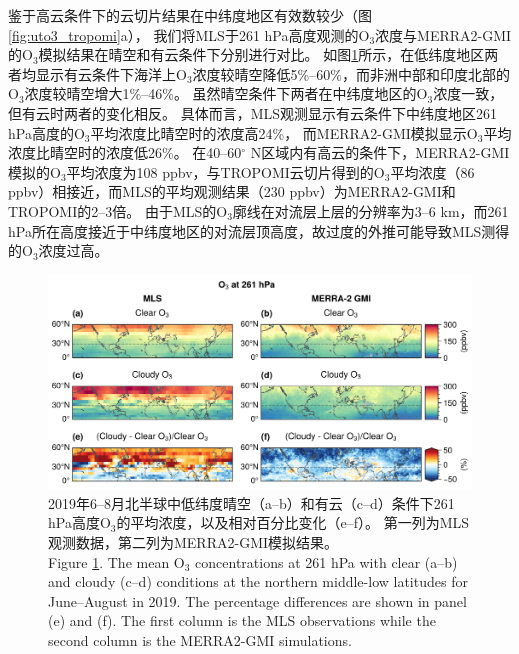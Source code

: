 鉴于高云条件下的云切片结果在中纬度地区有效数较少（图\ref{fig:uto3_tropomi}a），
我们将MLS于261 hPa高度观测的O$_3$浓度与MERRA2-GMI的O$_3$模拟结果在晴空和有云条件下分别进行对比。
如图\ref{fig:mls_o3_261hpa}所示，在低纬度地区两者均显示有云条件下海洋上O$_3$浓度较晴空降低5\%--60\%，而非洲中部和印度北部的O$_3$浓度较晴空增大1\%--46\%。
虽然晴空条件下两者在中纬度地区的O$_3$浓度一致，但有云时两者的变化相反。
具体而言，MLS观测显示有云条件下中纬度地区261 hPa高度的O$_3$平均浓度比晴空时的浓度高24\%，
而MERRA2-GMI模拟显示O$_3$平均浓度比晴空时的浓度低26\%。
在40--60$^{\circ}$ N区域内有高云的条件下，MERRA2-GMI模拟的O$_3$平均浓度为108 ppbv，与TROPOMI云切片得到的O$_3$平均浓度（86 ppbv）相接近，而MLS的平均观测结果（230 ppbv）为MERRA2-GMI和TROPOMI的2--3倍。
由于MLS的O$_3$廓线在对流层上层的分辨率为3--6 km，而261 hPa所在高度接近于中纬度地区的对流层顶高度，故过度的外推可能导致MLS测得的O$_3$浓度过高\citep{Schoeberl.2007}。


\begin{figure}[H]
    \centering
    \includegraphics[width=16cm]{./figures/mls_o3_261hpa.png}
    \caption{
    2019年6--8月北半球中低纬度晴空（a--b）和有云（c--d）条件下261 hPa高度O$_3$的平均浓度，以及相对百分比变化（e--f）。
    第一列为MLS观测数据，第二列为MERRA2-GMI模拟结果。 \\
    Figure \ref{fig:mls_o3_261hpa}. The mean O$_3$ concentrations at 261 hPa with clear (a--b) and cloudy (c--d) conditions at the northern middle-low latitudes for June--August in 2019. The percentage differences are shown in panel (e) and (f).
    The first column is the MLS observations while the second column is the MERRA2-GMI simulations.
    }
    \label{fig:mls_o3_261hpa}
\end{figure}


